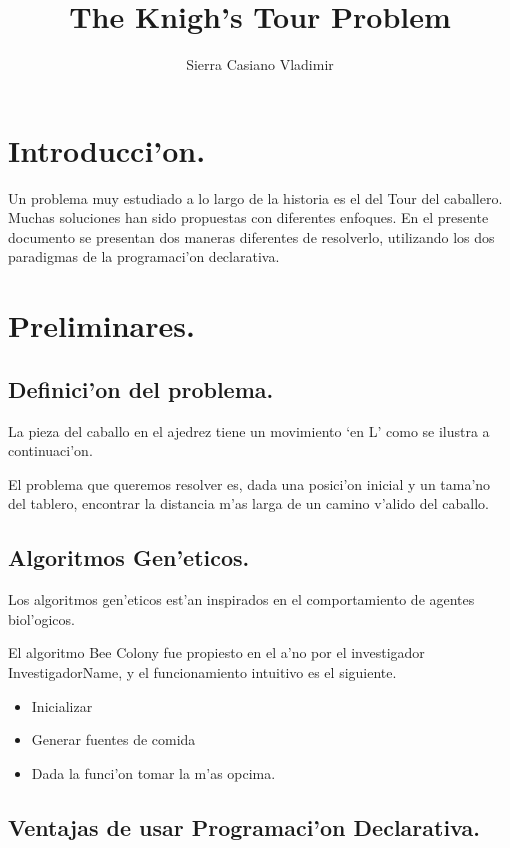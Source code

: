 \documentclass[11pt]{article}
\title{The Knigh's Tour Problem}
\author{Sierra Casiano Vladimir}
\begin{document}
    \maketitle
    
    \section{Introducci'on.}

    Un problema muy estudiado a lo largo de la historia es el del Tour del caballero.
    Muchas soluciones han sido propuestas con diferentes enfoques. En el presente
    documento se presentan dos maneras diferentes de resolverlo, utilizando los dos paradigmas de
    la programaci'on declarativa.


    \section{Preliminares.}

    \subsection{Definici'on del problema.}
    La pieza del caballo en el ajedrez tiene un movimiento `en L' \; como
    se ilustra a continuaci'on.

    El problema que queremos resolver es, dada una posici'on inicial y un tama'no del tablero,
    encontrar la distancia m'as larga de un camino v'alido del caballo.

    \subsection{Algoritmos Gen'eticos.}
    Los algoritmos gen'eticos est'an inspirados en el comportamiento de
    agentes biol'ogicos.

    El algoritmo Bee Colony fue propiesto en el a'no por el investigador InvestigadorName,
    y el funcionamiento intuitivo es el siguiente.

    \begin{itemize}
        \item Inicializar
        \item Generar fuentes de comida
        \item Dada la funci'on tomar la m'as opcima.
    \end{itemize}

    \subsection{Ventajas de usar Programaci'on Declarativa.}
\end{document}
